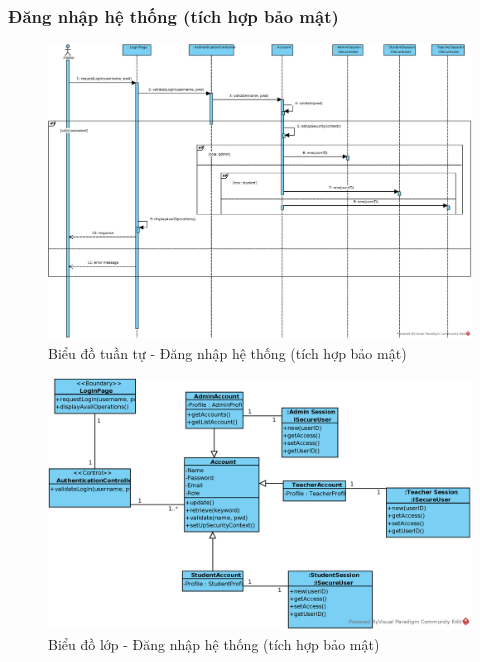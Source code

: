 \documentclass[./../main.tex]{subfiles}
\begin{document}
\subsubsection{Đăng nhập hệ thống (tích hợp bảo mật)}
\begin{figure}[H]
    \centering
    \includegraphics[width=\linewidth]{./images/UseCaseDesignDiagram/ucr_sec_login.eps}
    \caption{Biểu đồ tuần tự - Đăng nhập hệ thống (tích hợp bảo mật)}
\end{figure}
\begin{figure}[H]
    \centering
    \includegraphics[width=\linewidth]{./images/UseCaseDesignDiagram/ucd_sec_login.eps}
    \caption{Biểu đồ lớp - Đăng nhập hệ thống (tích hợp bảo mật)}
\end{figure}
\end{document}
